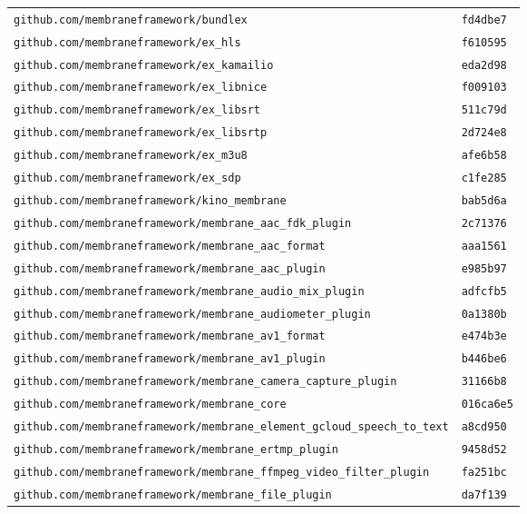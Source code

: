 \begin{longtable}{@{}p{} l@{}}
\texttt{github.com/membraneframework/bundlex} & \texttt{fd4dbe7} \\
\texttt{github.com/membraneframework/ex\_hls} & \texttt{f610595} \\
\texttt{github.com/membraneframework/ex\_kamailio} & \texttt{eda2d98} \\
\texttt{github.com/membraneframework/ex\_libnice} & \texttt{f009103} \\
\texttt{github.com/membraneframework/ex\_libsrt} & \texttt{511c79d} \\
\texttt{github.com/membraneframework/ex\_libsrtp} & \texttt{2d724e8} \\
\texttt{github.com/membraneframework/ex\_m3u8} & \texttt{afe6b58} \\
\texttt{github.com/membraneframework/ex\_sdp} & \texttt{c1fe285} \\
\texttt{github.com/membraneframework/kino\_membrane} & \texttt{bab5d6a} \\
\texttt{github.com/membraneframework/membrane\_aac\_fdk\_plugin} & \texttt{2c71376} \\
\texttt{github.com/membraneframework/membrane\_aac\_format} & \texttt{aaa1561} \\
\texttt{github.com/membraneframework/membrane\_aac\_plugin} & \texttt{e985b97} \\
\texttt{github.com/membraneframework/membrane\_audio\_mix\_plugin} & \texttt{adfcfb5} \\
\texttt{github.com/membraneframework/membrane\_audiometer\_plugin} & \texttt{0a1380b} \\
\texttt{github.com/membraneframework/membrane\_av1\_format} & \texttt{e474b3e} \\
\texttt{github.com/membraneframework/membrane\_av1\_plugin} & \texttt{b446be6} \\
\texttt{github.com/membraneframework/membrane\_camera\_capture\_plugin} & \texttt{31166b8} \\
\texttt{github.com/membraneframework/membrane\_core} & \texttt{016ca6e5} \\
\texttt{github.com/membraneframework/membrane\_element\_gcloud\_speech\_to\_text} & \texttt{a8cd950} \\
\texttt{github.com/membraneframework/membrane\_ertmp\_plugin} & \texttt{9458d52} \\
\texttt{github.com/membraneframework/membrane\_ffmpeg\_video\_filter\_plugin} & \texttt{fa251bc} \\
\texttt{github.com/membraneframework/membrane\_file\_plugin} & \texttt{da7f139} \\

\end{longtable}
